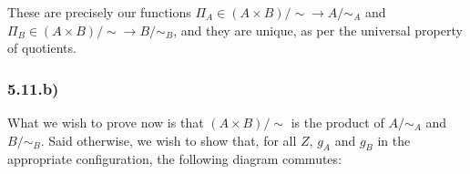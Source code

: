 
These are precisely our functions $\Pi_A \in (A \times B)/\sim \to A/\sim_A$ and $\Pi_B \in (A \times B)/\sim \to B/\sim_B$, and they are unique, as per the universal property of quotients.


\subsubsection*{5.11.b)}

What we wish to prove now is that $(A \times B)/\sim$ is the product of $A/\sim_A$ and $B/\sim_B$. Said otherwise, we wish to show that, for all $Z$, $g_A$ and $g_B$ in the appropriate configuration, the following diagram commutes:


